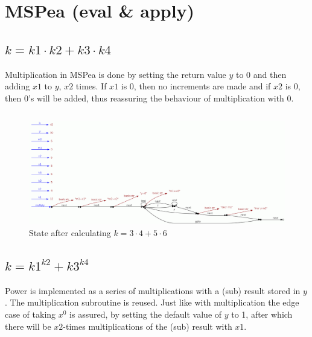 \documentclass[a4paper,12px]{article}
\begin{document}
\newcommand{\Sum}[2]{\sum^{#2}_{#1}}
\newcommand{\E}[1]{{\mathbb{E}\left[#1\right]}}
\newcommand{\var}[1]{{\text{var}\left[#1\right]}}
\newcommand{\diffpart}[1]{\frac{\partial}{\partial{} #1}}
\newcommand{\?}{\stackrel{?}{=}}
\newcommand{\intinf}{\int\limits_{-\infty}^{\infty}}
\newcommand{\intnulinf}{\int\limits_{0}^{\infty}}
\newcommand{\intpi}{\int\limits_{0}^{2\pi}}
\newcommand{\argmin}[1]{\underset{#1}{\mathop{\mathrm{argmin}}}}
\newcommand{\argmax}[1]{\underset{#1}{\mathop{\mathrm{argmax}}}}


\section{MSPea (eval \& apply)}
\subsection{$k = k1\cdot k2+k3\cdot k4$}
Multiplication in MSPea is done by setting the return value $y$ to 0 and then adding $x1$ to $y$, $x2$ times. If $x1$ is $0$, then no increments are made and if $x2$ is 0, then 0's will be added, thus reassuring the behaviour of multiplication with 0.

\inputminted[bgcolor=bg]{C}{mult.mspea}

\begin{figure}[h]
    \centering
    \includegraphics[width=0.8\linewidth]{mult_mspea.png}
    \caption{State after calculating $k = 3\cdot4 + 5\cdot6$}
\end{figure}
\FloatBarrier%

\subsection{$k = k1^{k2}+k3^{k4}$}
Power is implemented as a series of multiplications with a (sub) result stored in $y$. The multiplication subroutine is reused. Just like with multiplication the edge case of taking $x^0$ is assured, by setting the default value of $y$ to 1, after which there will be $x2$-times multiplications of the (sub) result with $x1$.
\end{document}

